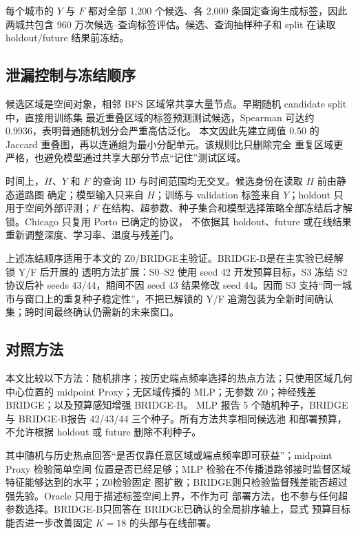 \documentclass[UTF8,a4paper,10pt,twocolumn]{ctexart}
\newcommand{\zmethod}{Z0}
\newcommand{\gmethod}{BRIDGE}
\newcommand{\bmethod}{BRIDGE-B}
\begin{document}
每个城市的 $Y$ 与 $F$ 都对全部 1,200 个候选、各 2,000 条固定查询生成标签，因此两城共包含
960 万次候选--查询标签评估。候选、查询抽样种子和 split 在读取 holdout/future 结果前冻结。

\subsection{泄漏控制与冻结顺序}

候选区域是空间对象，相邻 BFS 区域常共享大量节点。早期随机 candidate split 中，直接用训练集
最近重叠区域的标签预测测试候选，Spearman 可达约 0.9936，表明普通随机划分会严重高估泛化。
本文因此先建立阈值 0.50 的 Jaccard 重叠图，再以连通组为最小分配单元。该规则比只删除完全
重复区域更严格，也避免模型通过共享大部分节点“记住”测试区域。

时间上，$H$、$Y$ 和 $F$ 的查询 ID 与时间范围均无交叉。候选身份在读取 $H$ 前由静态道路图
确定；模型输入只来自 $H$；训练与 validation 标签来自 $Y$；holdout 只用于空间外部评测；$F$
在结构、超参数、种子集合和模型选择策略全部冻结后才解锁。Chicago 只复用 Porto 已确定的协议，
不依据其 holdout、future 或在线结果重新调整深度、学习率、温度与残差门。

上述冻结顺序适用于本文的 \zmethod/\gmethod 主验证。\bmethod 是在主实验已经解锁 Y/F 后开展的
透明方法扩展：S0--S2 使用 seed 42 开发预算目标，S3 冻结 S2 协议后补 seeds 43/44，期间不因
seed 43 结果修改 seed 44。因而 S3 支持“同一城市与窗口上的重复种子稳定性”，不把已解锁的
Y/F 追溯包装为全新时间确认集；跨时间最终确认仍需新的未来窗口。

\subsection{对照方法}

本文比较以下方法：随机排序；按历史端点频率选择的热点方法；只使用区域几何中心位置的 midpoint
Proxy；无区域传播的 MLP；无参数 \zmethod；神经残差 \gmethod；以及预算感知增强 \bmethod。
MLP 报告 5 个随机种子，\gmethod 与 \bmethod 报告 42/43/44 三个种子。所有方法共享相同候选池
和部署预算，不允许根据 holdout 或 future 删除不利种子。

其中随机与历史热点回答“是否仅靠任意区域或端点频率即可获益”；midpoint Proxy 检验简单空间
位置是否已经足够；MLP 检验在不传播道路邻接时监督区域特征能够达到的水平；\zmethod 检验固定
图扩散；\gmethod 则只检验监督残差能否超过强先验。Oracle 只用于描述标签空间上界，不作为可
部署方法，也不参与任何超参数选择。\bmethod 只回答在 \gmethod 已确认的全局排序轴上，显式
预算目标能否进一步改善固定 $K=18$ 的头部与在线部署。
\end{document}
